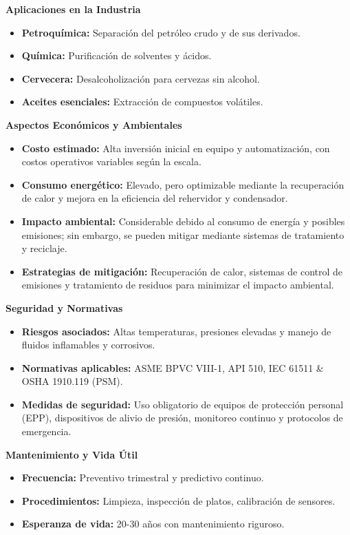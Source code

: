 \textbf{Aplicaciones en la Industria} \\
\begin{itemize}
    \item \textbf{Petroquímica:} Separación del petróleo crudo y de sus derivados.
    \item \textbf{Química:} Purificación de solventes y ácidos.
    \item \textbf{Cervecera:} Desalcoholización para cervezas sin alcohol.
    \item \textbf{Aceites esenciales:} Extracción de compuestos volátiles.
\end{itemize}

\textbf{Aspectos Económicos y Ambientales} \\
\begin{itemize}
    \item \textbf{Costo estimado:} Alta inversión inicial en equipo y automatización, con costos operativos variables según la escala.
    \item \textbf{Consumo energético:} Elevado, pero optimizable mediante la recuperación de calor y mejora en la eficiencia del rehervidor y condensador.
    \item \textbf{Impacto ambiental:} Considerable debido al consumo de energía y posibles emisiones; sin embargo, se pueden mitigar mediante sistemas de tratamiento y reciclaje.
    \item \textbf{Estrategias de mitigación:} Recuperación de calor, sistemas de control de emisiones y tratamiento de residuos para minimizar el impacto ambiental.
\end{itemize}

\textbf{Seguridad y Normativas} \\
\begin{itemize}
    \item \textbf{Riesgos asociados:} Altas temperaturas, presiones elevadas y manejo de fluidos inflamables y corrosivos.
    \item \textbf{Normativas aplicables:} ASME BPVC VIII-1, API 510, IEC 61511 \& OSHA 1910.119 (PSM).
    \item \textbf{Medidas de seguridad:} Uso obligatorio de equipos de protección personal (EPP), dispositivos de alivio de presión, monitoreo continuo y protocolos de emergencia.
\end{itemize}

\textbf{Mantenimiento y Vida Útil} \\
\begin{itemize}
    \item \textbf{Frecuencia:} Preventivo trimestral y predictivo continuo.
    \item \textbf{Procedimientos:} Limpieza, inspección de platos, calibración de sensores.
    \item \textbf{Esperanza de vida:} 20-30 años con mantenimiento riguroso.
\end{itemize}
